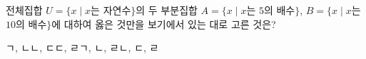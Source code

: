 전체집합 $U=\{x \mid x$는 자연수$\}$의 두 부분집합 $A=\{x \mid x$는 $5$의 배수$\}$, $B=\{x \mid x$는 $10$의 배수$\}$에 대하여 옳은 것만을 보기에서 있는 대로 고른 것은? 
\begin{choices32}{ㄱ, ㄴ}{ㄴ, ㄷ}{ㄷ, ㄹ}{ㄱ, ㄴ, ㄹ}{ㄴ, ㄷ, ㄹ}\end{choices32}
